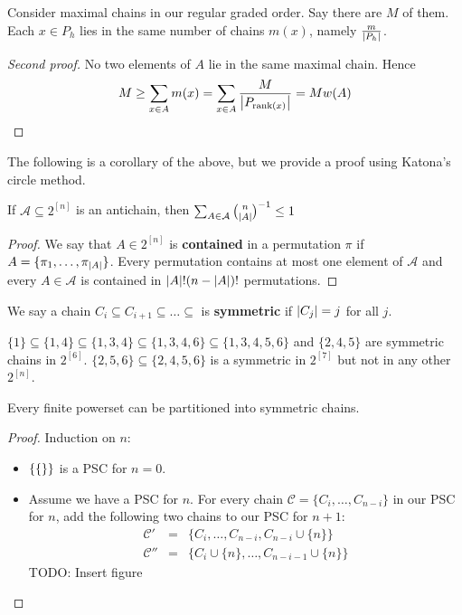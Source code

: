 \documentclass{article}
\begin{document}
\newlec

Consider maximal chains in our regular graded order. Say there are $M$ of them. Each $x \in P_h$ lies in the same number of chains $m(x)$, namely $\frac m{\left\lvert P_h\right\rvert}$.

\begin{proof}[Second proof]
  No two elements of $A$ lie in the same maximal chain. Hence
  $$M \ge \sum_{x \in A} m(x) = \sum_{x \in A} \frac M{\left\lvert P_{\operatorname{rank}(x)}\right\rvert} = Mw(A)$$
\end{proof}

The following is a corollary of the above, but we provide a proof using Katona's circle method.

\begin{nthm}
  If $\mathcal A \subseteq 2^{[n]}$ is an antichain, then $\sum_{A \in \mathcal A} {\binom n {\left\lvert A\right\rvert}}^{-1} \le 1$
\end{nthm}
\begin{proof}
  We say that $A \in 2^{[n]}$ is {\bf contained} in a permutation $\pi$ if $A = \{\pi_1, \dots, \pi_{\left\lvert A\right\rvert}\}$. Every permutation contains at most one element of $\mathcal A$ and every $A \in \mathcal A$ is contained in $\left\lvert A\right\rvert!(n - \left\lvert A\right\rvert)!$ permutations.
\end{proof}

We say a chain $C_i \subseteq C_{i + 1} \subseteq \dots \subseteq$ is {\bf symmetric} if $\left\lvert C_j\right\rvert = j$ for all $j$.

\begin{egs}
  $\{1\} \subseteq \{1, 4\} \subseteq \{1, 3, 4\} \subseteq \{1, 3, 4, 6\} \subseteq \{1, 3, 4, 5, 6\}$ and $\{2, 4, 5\}$ are symmetric chains in $2^{[6]}$. $\{2, 5, 6\} \subseteq \{2, 4, 5, 6\}$ is a symmetric in $2^{[7]}$ but not in any other $2^{[n]}$.
\end{egs}

\begin{nthm}
  Every finite powerset can be partitioned into symmetric chains.
\end{nthm}
\begin{proof}
  Induction on $n$:
  \begin{itemize}
    \item $\{\{\empty\}\}$ is a PSC for $n = 0$.
    \item Assume we have a PSC for $n$. For every chain $\mathcal C = \{C_i, \dots, C_{n - i}\}$ in our PSC for $n$, add the following two chains to our PSC for $n + 1$:
    \begin{eqnarray*}
      \mathcal C' & = & \{C_i, \dots, C_{n - i}, C_{n - i} \cup \{n\}\} \\
      \mathcal C'' & = & \{C_i \cup \{n\}, \dots, C_{n - i - 1} \cup \{n\}\}
    \end{eqnarray*}
    TODO: Insert figure
  \end{itemize}
\end{proof}
\end{document}
